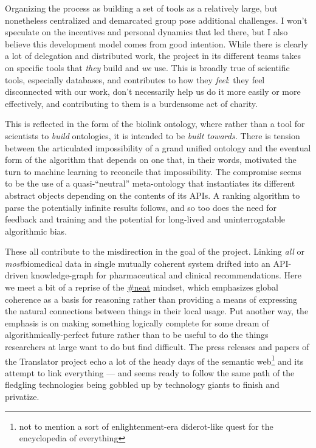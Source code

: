 \documentclass[10pt]{article}
\begin{document}
\begin{multicols}{2}
Organizing the process as building a set of tools as a relatively large,
but nonetheless centralized and demarcated group pose additional
challenges. I won't speculate on the incentives and personal dynamics
that led there, but I also believe this development model comes from
good intention. While there is clearly a lot of delegation and
distributed work, the project in its different teams takes on specific
tools that \emph{they} build and \emph{we} use. This is broadly true of
scientific tools, especially databases, and contributes to how they
\emph{feel}: they feel disconnected with our work, don't necessarily
help us do it more easily or more effectively, and contributing to them
is a burdensome act of charity.

This is reflected in the form of the biolink ontology, where rather than
a tool for scientists to \emph{build} ontologies, it is intended to be
\emph{built towards.} There is tension between the articulated
impossibility of a grand unified ontology and the eventual form of the
algorithm that depends on one that, in their words, motivated the turn
to machine learning to reconcile that impossibility. The compromise
seems to be the use of a quasi-``neutral'' meta-ontology that
instantiates its different abstract objects depending on the contents of
its APIs. A ranking algorithm to parse the potentially infinite results
follows, and so too does the need for feedback and training and the
potential for long-lived and uninterrogatable algorithmic bias.

These all contribute to the misdirection in the goal of the project.
Linking \emph{all} or \emph{most}biomedical data in single mutually
coherent system drifted into an API-driven knowledge-graph for
pharmaceutical and clinical recommendations. Here we meet a bit of a
reprise of the \protect\hyperlink{neatness-vs-scruffiness}{\#neat}
mindset, which emphasizes global coherence as a basis for reasoning
rather than providing a means of expressing the natural connections
between things in their local usage. Put another way, the emphasis is on
making something logically complete for some dream of
algorithmically-perfect future rather than to be useful to do the things
researchers at large want to do but find difficult. The press releases
and papers of the Translator project echo a lot of the heady days of the
semantic web\footnote{not to mention a sort of enlightenment-era
  diderot-like quest for the encyclopedia of everything} and its attempt
to link everything --- and seems ready to follow the same path of the
fledgling technologies being gobbled up by technology giants to finish
and privatize.


\end{multicols}
\end{document}
